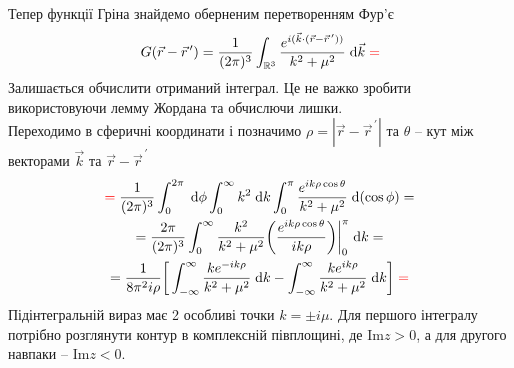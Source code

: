 Тепер функції Гріна знайдемо оберненим перетворенням Фур'є
\begin{equation}
    G(\vec{r} - \vec{r}^{\,\prime}) = \frac{1}{(2\pi)^3} \int_{\mathbb{R}^3} \frac{e^{i(\vec{k} \cdot (\vec{r} - \vec{r}^{\,\prime}))}}{k^2 + \mu^2} \;\mathrm{d}\vec{k} \; \textcolor{red}{=}
\end{equation}  
Залишається обчислити отриманий інтеграл. Це не важко зробити використовуючи лемму Жордана та обчислючи лишки.\\
Переходимо в сферичні координати і позначимо $\rho = |\vec{r} - \vec{r}^{\,\prime}|$ та $\theta$ -- кут між векторами $\vec{k}$ та $\vec{r} - \vec{r}^{\,\prime}$ 
\begin{equation*}
    \begin{gathered}
        \textcolor{red}{=} \; \frac{1}{(2\pi)^3} \int_0^{2\pi} \;\mathrm{d}\phi \int_0^\infty k^2 \;\mathrm{d}k \int_0^\pi \frac{e^{ik\rho \cos\theta}}{k^2 + \mu^2} \;\mathrm{d}(\cos\phi) =\\
        = \frac{2\pi}{(2\pi)^3} \int_0^\infty \frac{k^2}{k^2 + \mu^2} \bigg( \frac{e^{ik\rho \cos\theta}}{ik\rho} \bigg) \bigg|_0^\pi \;\mathrm{d}k =\\
        = \frac{1}{8\pi^2i\rho} \bigg[ \int_{-\infty}^\infty \frac{ke^{-ik\rho}}{k^2 + \mu^2} \;\mathrm{d}k - \int_{-\infty}^\infty \frac{ke^{ik\rho}}{k^2 + \mu^2} \;\mathrm{d}k \bigg] \; \textcolor{red}{=}
    \end{gathered}
\end{equation*}  
Підінтегральній вираз має 2 особливі точки $k = \pm i\mu$. Для першого інтегралу потрібно розглянути контур в комплексній півплощині, де $\mathrm{Im}z > 0$, а для другого навпаки -- $\mathrm{Im}z < 0$. 

\begin{figure}[h]
    \centering
\end{figure}

